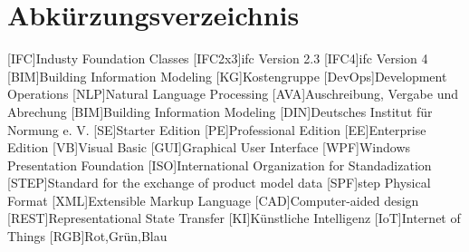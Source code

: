 \chapter{Abkürzungsverzeichnis}
\begin{acronym}
[IFC]{Industy Foundation Classes}
[IFC2x3]{\ac{ifc} Version 2.3}
[IFC4]{\ac{ifc} Version 4}
[BIM]{Building Information Modeling}
[KG]{Kostengruppe}
[DevOps]{Development Operations}
[NLP]{Natural Language Processing}
[AVA]{Auschreibung, Vergabe und Abrechung}
[BIM]{Building Information Modeling}
[DIN]{Deutsches Institut für Normung e. V.}
[SE]{Starter Edition}
[PE]{Professional Edition}
[EE]{Enterprise Edition}
[VB]{Visual Basic}
[GUI]{Graphical User Interface}
[WPF]{Windows Presentation Foundation}
[ISO]{International Organization for Standadization}
[STEP]{Standard for the exchange of product model data}
[SPF]{\ac{step} Physical Format}
[XML]{Extensible Markup Language}
[CAD]{Computer-aided design}
[REST]{Representational State Transfer}
[KI]{Künstliche Intelligenz}
[IoT]{Internet of Things}
[RGB]{Rot,Grün,Blau}
\end{acronym}